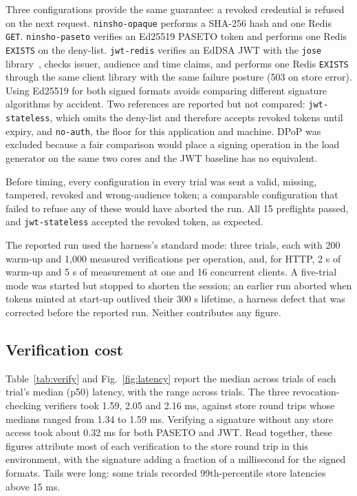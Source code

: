 \documentclass[conference]{IEEEtran}
\begin{document}
Three configurations provide the same guarantee: a revoked credential is refused on the next request. \texttt{ninsho-opaque} performs a SHA-256 hash and one Redis \texttt{GET}. \texttt{ninsho-paseto} verifies an Ed25519 PASETO token and performs one Redis \texttt{EXISTS} on the deny-list. \texttt{jwt-redis} verifies an EdDSA JWT with the \texttt{jose} library~\cite{jose}, checks issuer, audience and time claims, and performs one Redis \texttt{EXISTS} through the same client library with the same failure posture (503 on store error). Using Ed25519 for both signed formats avoids comparing different signature algorithms by accident. Two references are reported but not compared: \texttt{jwt-stateless}, which omits the deny-list and therefore accepts revoked tokens until expiry, and \texttt{no-auth}, the floor for this application and machine. DPoP was excluded because a fair comparison would place a signing operation in the load generator on the same two cores and the JWT baseline has no equivalent.

Before timing, every configuration in every trial was sent a valid, missing, tampered, revoked and wrong-audience token; a comparable configuration that failed to refuse any of these would have aborted the run. All 15 preflights passed, and \texttt{jwt-stateless} accepted the revoked token, as expected.

The reported run used the harness's standard mode: three trials, each with 200 warm-up and 1,000 measured verifications per operation, and, for HTTP, 2 s of warm-up and 5 s of measurement at one and 16 concurrent clients. A five-trial mode was started but stopped to shorten the session; an earlier run aborted when tokens minted at start-up outlived their 300 s lifetime, a harness defect that was corrected before the reported run. Neither contributes any figure.

\subsection{Verification cost}
Table~\ref{tab:verify} and Fig.~\ref{fig:latency} report the median across trials of each trial's median (p50) latency, with the range across trials. The three revocation-checking verifiers took 1.59, 2.05 and 2.16 ms, against store round trips whose medians ranged from 1.34 to 1.59 ms. Verifying a signature without any store access took about 0.32 ms for both PASETO and JWT. Read together, these figures attribute most of each verification to the store round trip in this environment, with the signature adding a fraction of a millisecond for the signed formats. Tails were long: some trials recorded 99th-percentile store latencies above 15 ms.
\end{document}
